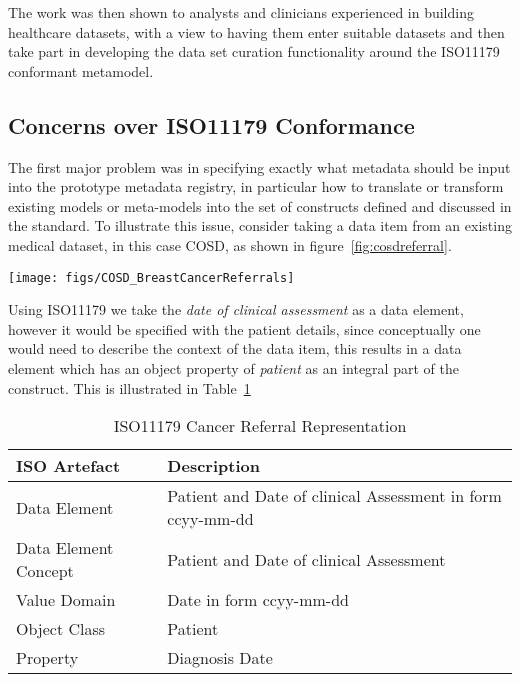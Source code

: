\documentclass[runningheads]{llncs}
\begin{document}
	The work was then shown to analysts and clinicians experienced in building healthcare datasets, with a view to having them enter suitable datasets and then take part in developing the data set curation functionality around the ISO11179 conformant metamodel.
	
	\subsection{Concerns over ISO11179 Conformance}
	The first major problem was in specifying exactly what metadata should be input into the prototype metadata registry, in particular how to translate or transform existing models or meta-models into the set of constructs defined and discussed in the standard. To illustrate this issue, consider taking a data item from an existing medical dataset, in this case COSD, as shown in figure~\ref{fig:cosdreferral}.
	
	\begin{figure*}[h]
		\texttt{[image: figs/COSD\_BreastCancerReferrals]}
		\caption{COSD Dataset Excerpt}
		\label{fig:cosdreferral}
	\end{figure*}
	
	Using ISO11179 we take the \emph{date of clinical assessment} as a data element, however it would be specified with the patient details, since conceptually one would need to describe the context of the data item, this results in a data element which has an object property of \emph{patient} as an integral part of the construct. This is illustrated in Table~\ref{tab:isoobjects}
	\begin{table}[h]
		\begin{center}
			\caption{ISO11179 Cancer Referral Representation}
			\label{tab:isoobjects}
			\begin{tabular}{ p{2cm} | p{4cm}  } 
				\textbf{ISO Artefact} & \textbf{Description} \\
				\hline
				Data Element & Patient and Date of clinical Assessment in form ccyy-mm-dd  \\ 
				\hline
				Data Element Concept & Patient and Date of clinical Assessment  \\ 
				\hline
				Value Domain & Date in form ccyy-mm-dd \\ 
				\hline
				Object Class & Patient\\
				\hline
				Property& Diagnosis Date \\
			\end{tabular}
		\end{center}
	\end{table}
	
\end{document}
